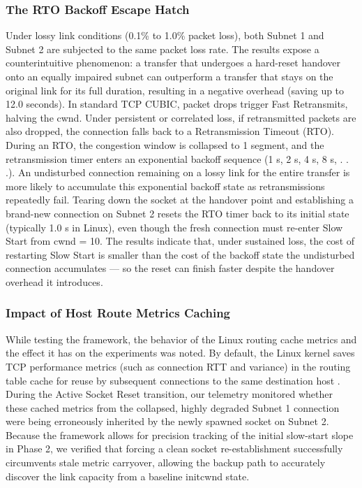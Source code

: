 \documentclass[conference]{IEEEtran}
\begin{document}
\subsubsection{The RTO Backoff Escape Hatch}
Under lossy link conditions (0.1\% to 1.0\% packet loss), both Subnet 1 and Subnet 2 are subjected to the same packet loss rate. The results expose a counterintuitive phenomenon: a transfer that undergoes a hard-reset handover onto an equally impaired subnet can outperform a transfer that stays on the original link for its full duration, resulting in a negative overhead (saving up to 12.0 seconds).
In standard TCP CUBIC, packet drops trigger Fast Retransmits, halving the cwnd. Under persistent or correlated loss, if retransmitted packets are also dropped, the connection falls back to a Retransmission Timeout (RTO). During an RTO, the congestion window is collapsed to 1 segment, and the retransmission timer enters an exponential backoff sequence (1 s, 2 s, 4 s, 8 s, . . .).
An undisturbed connection remaining on a lossy link for the entire transfer is more likely to accumulate this exponential backoff state as retransmissions repeatedly fail. Tearing down the socket at the handover point and establishing a brand-new connection on Subnet 2 resets the RTO timer back to its initial state (typically 1.0 s in Linux), even though the fresh connection must re-enter Slow Start from cwnd = 10. The results indicate that, under sustained loss, the cost of restarting Slow Start is smaller than the cost of the backoff state the undisturbed connection accumulates — so the reset can finish faster despite the handover overhead it introduces.

\subsubsection{Impact of Host Route Metrics Caching}
 While testing the framework, the behavior of the Linux routing cache metrics and the effect it has on the experiments was noted. By default, the Linux kernel saves TCP performance metrics (such as connection RTT and variance) in the routing table cache for reuse by subsequent connections to the same destination host \cite{Touch2021RFC9040}. During the Active Socket Reset transition, our telemetry monitored whether these cached metrics from the collapsed, highly degraded Subnet 1 connection were being erroneously inherited by the newly spawned socket on Subnet 2. Because the framework allows for precision tracking of the initial slow-start slope in Phase 2, we verified that forcing a clean socket re-establishment successfully circumvents stale metric carryover, allowing the backup path to accurately discover the link capacity from a baseline initcwnd state.
\end{document}
